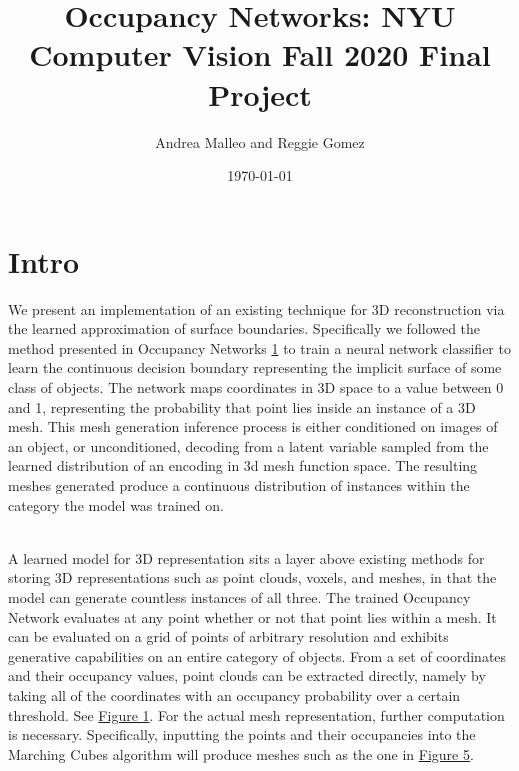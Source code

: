 \documentclass[11pt]{article}
\author{Andrea Malleo and Reggie Gomez}
\date{\today}
\title{Occupancy Networks: NYU Computer Vision Fall 2020 Final Project}
\begin{document}
\maketitle
\section{Intro}

\begin{multicols}{2}
  We present an implementation of an existing technique for 3D reconstruction via the learned approximation of surface boundaries. Specifically we followed the method presented in Occupancy Networks \hyperlink{ref1}{1} to train a neural network classifier to learn the continuous decision boundary representing the implicit surface of some class of objects. The network maps coordinates in 3D space to a value between 0 and 1, representing the probability that point lies inside an instance of a 3D mesh. This mesh generation inference process is either conditioned on images of an object, or unconditioned, decoding from a latent variable sampled from the learned distribution of an encoding in 3d mesh function space. The resulting meshes generated produce a continuous distribution of instances within the category the model was trained on.
  \par
  \\
  A learned model for 3D representation sits a layer above existing methods for storing 3D representations such as point clouds, voxels, and meshes, in that the model can generate countless instances of all three. The trained Occupancy Network evaluates at any point whether or not that point lies within a mesh. It can be evaluated on a grid of points of arbitrary resolution and exhibits generative capabilities on an entire category of objects. From a set of coordinates and their occupancy values, point clouds can be extracted directly, namely by taking all of the coordinates with an occupancy probability over a certain threshold. See \hyperlink{fig1}{Figure 1}. For the actual mesh representation, further computation is necessary. Specifically, inputting the points and their occupancies into the Marching Cubes algorithm will produce meshes such as the one in \hyperlink{fig5}{Figure 5}.


\end{multicols}
\end{document}
